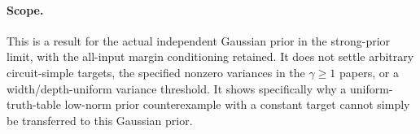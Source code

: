 \paragraph{Scope.}
This is a result for the actual independent Gaussian prior in the strong-prior
limit, with the all-input margin conditioning retained. It does not settle
arbitrary circuit-simple targets, the specified nonzero variances in the
$\gamma\ge1$ papers, or a width/depth-uniform variance threshold.
It shows specifically why a uniform-truth-table low-norm prior counterexample
with a constant target cannot simply be transferred to this Gaussian prior.
